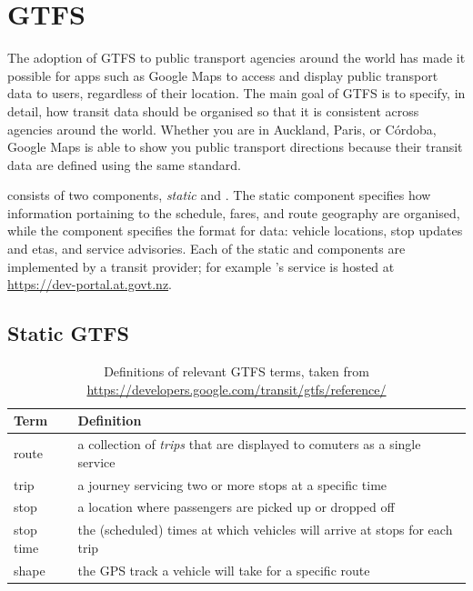 \section{GTFS}
\label{sec:gtfs}

The adoption of GTFS \citep{GoogleDevelopers_2006} to public transport agencies around the world has made it possible for apps such as Google Maps to access and display public transport data to users, regardless of their location. The main goal of GTFS is to specify, in detail, how transit data should be organised so that it is consistent across agencies around the world. Whether you are in Auckland, Paris, or C\'ordoba, Google Maps is able to show you public transport directions because their transit data are defined using the same standard.


\GTFS{} consists of two components, \emph{static} and \emph{\rt{}}. The static component specifies how information portaining to the schedule, fares, and route geography are organised, while the \emph{\rt{}} component specifies the format for \rt{} data: vehicle locations, stop updates and \glspl{eta}, and service advisories. Each of the static and \rt{} components are implemented by a transit provider; for example \AT{}'s \GTFS{} service is hosted at \url{https://dev-portal.at.govt.nz}.


\subsection{Static GTFS}
\label{sec:gtfs_static}


\begin{table}[t]
\centering
\begin{tabular}{ll}
\toprule
Term & Definition \\
\midrule
route & a collection of \emph{trips} that are displayed to comuters
as a single service \\
trip & a journey servicing two or more stops at a specific time \\
stop & a location where passengers are picked up or dropped off \\
stop time & the (scheduled) times at which vehicles
will arrive at stops for each trip \\
shape & the GPS track a vehicle will take for a specific route \\
\bottomrule
\end{tabular}
\caption{Definitions of relevant GTFS terms, taken from
\url{https://developers.google.com/transit/gtfs/reference/}}
\label{tab:gtfs_terms}
\end{table}


